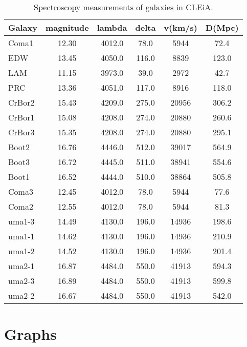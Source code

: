 \documentclass{article}
\begin{document}
\begin{table}[H]
\begin{center}
\begin{tabular}{l c c c c c}
\hline
Galaxy & magnitude & lambda & delta & v(km/s) & D(Mpc)\\
\hline
\hline
Coma1 & 12.30 & 4012.0 & 78.0 & 5944 & 72.4\\
EDW & 13.45 & 4050.0 & 116.0 & 8839 & 123.0\\
LAM & 11.15 & 3973.0 & 39.0 & 2972 & 42.7\\
PRC & 13.36 & 4051.0 & 117.0 & 8916 & 118.0\\
CrBor2 & 15.43 & 4209.0 & 275.0 & 20956 & 306.2\\
CrBor1 & 15.08 & 4208.0 & 274.0 & 20880 & 260.6\\
CrBor3 & 15.35 & 4208.0 & 274.0 & 20880 & 295.1\\
Boot2 & 16.76 & 4446.0 & 512.0 & 39017 & 564.9\\
Boot3 & 16.72 & 4445.0 & 511.0 & 38941 & 554.6\\
Boot1 & 16.52 & 4444.0 & 510.0 & 38864 & 505.8\\
Coma3 & 12.45 & 4012.0 & 78.0 & 5944 & 77.6\\
Coma2 & 12.55 & 4012.0 & 78.0 & 5944 & 81.3\\
uma1-3 & 14.49 & 4130.0 & 196.0 & 14936 & 198.6\\
uma1-1 & 14.62 & 4130.0 & 196.0 & 14936 & 210.9\\
uma1-2 & 14.52 & 4130.0 & 196.0 & 14936 & 201.4\\
uma2-1 & 16.87 & 4484.0 & 550.0 & 41913 & 594.3\\
uma2-3 & 16.89 & 4484.0 & 550.0 & 41913 & 599.8\\
uma2-2 & 16.67 & 4484.0 & 550.0 & 41913 & 542.0\\
\hline
\end{tabular}
\end{center}
\caption{Spectroscopy measurements of galaxies in CLEiA.\label{tab:main}}
\end{table}


\section{Graphs}
\end{document}

